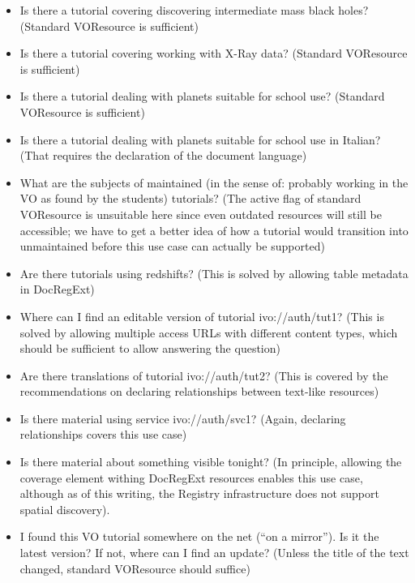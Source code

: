 \documentclass{ivoa}
\begin{document}
\begin{itemize}

\item Is there a tutorial covering discovering intermediate mass black
holes? (Standard VOResource is sufficient){}

\item Is there a tutorial covering working with X-Ray data? (Standard
VOResource is sufficient){}

\item Is there a tutorial dealing with planets suitable for school use?
(Standard VOResource is sufficient){}

\item Is there a tutorial dealing with planets suitable for school use in
Italian? (That requires the declaration of the document language){}

\item What are the subjects of maintained (in the sense of: probably
working in the VO as found by the students) tutorials?
(The active flag of standard VOResource is
unsuitable here since even outdated resources will still be accessible;
we have to get a better idea of how a tutorial would transition into
unmaintained before this use case can actually be supported)

\item Are there tutorials using redshifts? (This is solved by allowing
table metadata in DocRegExt){}

\item Where can I find an editable version of tutorial ivo://auth/tut1?
(This is solved by allowing multiple access URLs with different content
types, which should be sufficient to allow answering the question){}

\item Are there translations of tutorial ivo://auth/tut2? (This is covered
by the recommendations on declaring relationships between text-like
resources){}

\item Is there material using service ivo://auth/svc1? (Again, declaring
relationships covers this use case){}

\item Is there material about something visible tonight? (In principle,
allowing the coverage element withing DocRegExt resources enables this
use case, although as of this writing, the Registry infrastructure does
not support spatial discovery).

\item I found this VO tutorial somewhere on the net (``on a mirror'').  Is it
the latest version?  If not, where can I find an update? (Unless the
title of the text changed, standard VOResource should suffice){}

\end{itemize}
\end{document}
